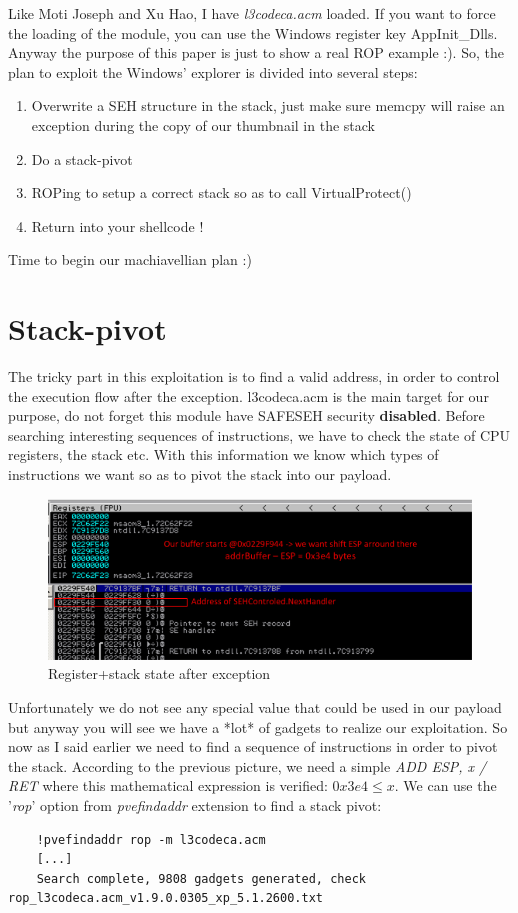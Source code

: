 \documentclass[12pt, titlepage]{article}
\begin{document}
Like Moti Joseph and Xu Hao, I have \emph{l3codeca.acm} loaded. If you want to force the loading of the module, you can use the Windows register key AppInit\_Dlls. Anyway the purpose of this paper is just to show a real ROP example :).
So, the plan to exploit the Windows' explorer is divided into several steps:
\begin{enumerate}
  \item Overwrite a SEH structure in the stack, just make sure memcpy will raise an exception during the copy of our thumbnail in the stack
  \item Do a stack-pivot
  \item ROPing to setup a correct stack so as to call VirtualProtect()
  \item Return into your shellcode !
\end{enumerate}
Time to begin our machiavellian plan :)

\section{Stack-pivot}
The tricky part in this exploitation is to find a valid address, in order to control the execution flow after the exception. l3codeca.acm is the main target for our purpose, do not forget this module have SAFESEH security \textbf{disabled}. Before searching interesting sequences of instructions, we have to check the state of CPU registers, the stack etc. With this information we know which types of instructions we want so as to pivot the stack into our payload.
\begin{figure}[h]
  \includegraphics{pics/stackstateexception.png}
  \caption{Register+stack state after exception}
  \label{Register+stack start after exception}
\end{figure}

Unfortunately we do not see any special value that could be used in our payload but anyway you will see we have a *lot* of gadgets to realize our exploitation. So now as I said earlier we need to find a sequence of instructions in order to pivot the stack. According to the previous picture, we need a simple \emph{ADD ESP, x / RET} where this mathematical expression is verified: $0x3e4 \le x$.
We can use the '\emph{rop}' option from \emph{pvefindaddr} extension to find a stack pivot:
\lstset{caption=Find stack pivot in l3codeca.acm module}
\begin{lstlisting}
    !pvefindaddr rop -m l3codeca.acm
    [...]
    Search complete, 9808 gadgets generated, check rop_l3codeca.acm_v1.9.0.0305_xp_5.1.2600.txt
\end{lstlisting}
\end{document}
